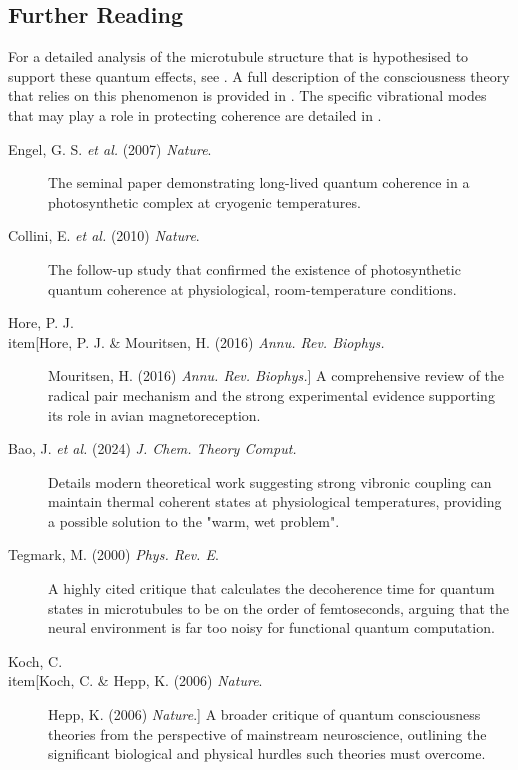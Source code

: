 \begin{importantbox}
\section*{Further Reading}
For a detailed analysis of the microtubule structure that is hypothesised to support these quantum effects, see . A full description of the consciousness theory that relies on this phenomenon is provided in . The specific vibrational modes that may play a role in protecting coherence are detailed in .
\begin{description}
\item[Engel, G. S. \textit{et al.} (2007) \textit{Nature}.] The seminal paper demonstrating long-lived quantum coherence in a photosynthetic complex at cryogenic temperatures.
\item[Collini, E. \textit{et al.} (2010) \textit{Nature}.] The follow-up study that confirmed the existence of photosynthetic quantum coherence at physiological, room-temperature conditions.
\item[Hore, P. J. \\item[Hore, P. J. & Mouritsen, H. (2016) \textit{Annu. Rev. Biophys.}] Mouritsen, H. (2016) \textit{Annu. Rev. Biophys.}] A comprehensive review of the radical pair mechanism and the strong experimental evidence supporting its role in avian magnetoreception.
\item[Bao, J. \textit{et al.} (2024) \textit{J. Chem. Theory Comput.}] Details modern theoretical work suggesting strong vibronic coupling can maintain thermal coherent states at physiological temperatures, providing a possible solution to the "warm, wet problem".
\end{description}
\begin{description}
\item[Tegmark, M. (2000) \textit{Phys. Rev. E}.] A highly cited critique that calculates the decoherence time for quantum states in microtubules to be on the order of femtoseconds, arguing that the neural environment is far too noisy for functional quantum computation.
\item[Koch, C. \\item[Koch, C. & Hepp, K. (2006) \textit{Nature}.] Hepp, K. (2006) \textit{Nature}.] A broader critique of quantum consciousness theories from the perspective of mainstream neuroscience, outlining the significant biological and physical hurdles such theories must overcome.
\end{description}
\end{importantbox}
